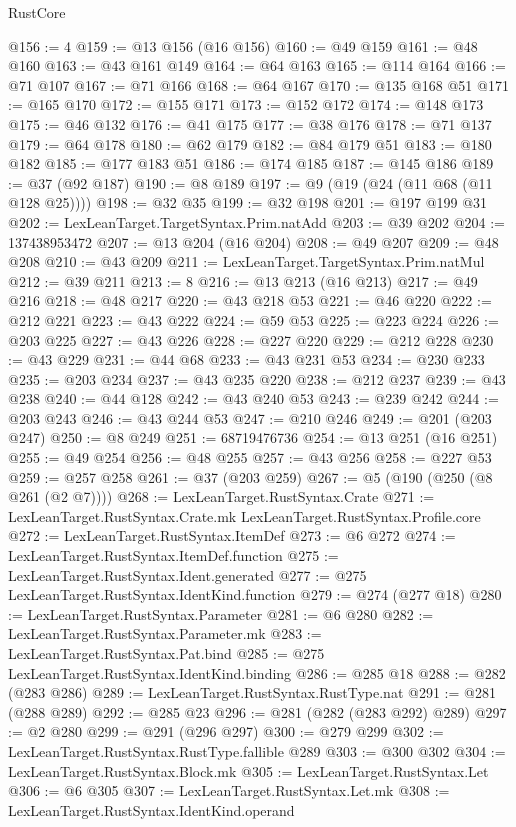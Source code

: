 \begin{lexlean}{RustCore}
\begin{coremodule}
@156 := 4
@159 := @13 @156 (@16 @156)
@160 := @49 @159
@161 := @48 @160
@163 := @43 @161 @149
@164 := @64 @163
@165 := @114 @164
@166 := @71 @107
@167 := @71 @166
@168 := @64 @167
@170 := @135 @168 @51
@171 := @165 @170
@172 := @155 @171
@173 := @152 @172
@174 := @148 @173
@175 := @46 @132
@176 := @41 @175
@177 := @38 @176
@178 := @71 @137
@179 := @64 @178
@180 := @62 @179
@182 := @84 @179 @51
@183 := @180 @182
@185 := @177 @183 @51
@186 := @174 @185
@187 := @145 @186
@189 := @37 (@92 @187)
@190 := @8 @189
@197 := @9 (@19 (@24 (@11 @68 (@11 @128 @25))))
@198 := @32 @35
@199 := @32 @198
@201 := @197 @199 @31
@202 := LexLeanTarget.TargetSyntax.Prim.natAdd
@203 := @39 @202
@204 := 137438953472
@207 := @13 @204 (@16 @204)
@208 := @49 @207
@209 := @48 @208
@210 := @43 @209
@211 := LexLeanTarget.TargetSyntax.Prim.natMul
@212 := @39 @211
@213 := 8
@216 := @13 @213 (@16 @213)
@217 := @49 @216
@218 := @48 @217
@220 := @43 @218 @53
@221 := @46 @220
@222 := @212 @221
@223 := @43 @222
@224 := @59 @53
@225 := @223 @224
@226 := @203 @225
@227 := @43 @226
@228 := @227 @220
@229 := @212 @228
@230 := @43 @229
@231 := @44 @68
@233 := @43 @231 @53
@234 := @230 @233
@235 := @203 @234
@237 := @43 @235 @220
@238 := @212 @237
@239 := @43 @238
@240 := @44 @128
@242 := @43 @240 @53
@243 := @239 @242
@244 := @203 @243
@246 := @43 @244 @53
@247 := @210 @246
@249 := @201 (@203 @247)
@250 := @8 @249
@251 := 68719476736
@254 := @13 @251 (@16 @251)
@255 := @49 @254
@256 := @48 @255
@257 := @43 @256
@258 := @227 @53
@259 := @257 @258
@261 := @37 (@203 @259)
@267 := @5 (@190 (@250 (@8 @261 (@2 @7))))
@268 := LexLeanTarget.RustSyntax.Crate
@271 := LexLeanTarget.RustSyntax.Crate.mk LexLeanTarget.RustSyntax.Profile.core
@272 := LexLeanTarget.RustSyntax.ItemDef
@273 := @6 @272
@274 := LexLeanTarget.RustSyntax.ItemDef.function
@275 := LexLeanTarget.RustSyntax.Ident.generated
@277 := @275 LexLeanTarget.RustSyntax.IdentKind.function
@279 := @274 (@277 @18)
@280 := LexLeanTarget.RustSyntax.Parameter
@281 := @6 @280
@282 := LexLeanTarget.RustSyntax.Parameter.mk
@283 := LexLeanTarget.RustSyntax.Pat.bind
@285 := @275 LexLeanTarget.RustSyntax.IdentKind.binding
@286 := @285 @18
@288 := @282 (@283 @286)
@289 := LexLeanTarget.RustSyntax.RustType.nat
@291 := @281 (@288 @289)
@292 := @285 @23
@296 := @281 (@282 (@283 @292) @289)
@297 := @2 @280
@299 := @291 (@296 @297)
@300 := @279 @299
@302 := LexLeanTarget.RustSyntax.RustType.fallible @289
@303 := @300 @302
@304 := LexLeanTarget.RustSyntax.Block.mk
@305 := LexLeanTarget.RustSyntax.Let
@306 := @6 @305
@307 := LexLeanTarget.RustSyntax.Let.mk
@308 := LexLeanTarget.RustSyntax.IdentKind.operand

\end{coremodule}
\end{lexlean}
